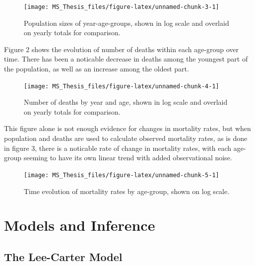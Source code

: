 \documentclass[
]{book}
\begin{document}
\begin{figure}[h]

{\centering \texttt{[image: MS\_Thesis\_files/figure-latex/unnamed-chunk-3-1]} 

}

\caption{Population sizes of year-age-groups, shown in log scale and overlaid on yearly totals for comparison.}\label{fig:unnamed-chunk-3}
\end{figure}

Figure 2 shows the evolution of number of deaths within each age-group over time. There has been a noticable decrease in deaths among the youngest part of the population, as well as an increase among the oldest part.

\begin{figure}[h]

{\centering \texttt{[image: MS\_Thesis\_files/figure-latex/unnamed-chunk-4-1]} 

}

\caption{Number of deaths by year and age, shown in log scale and overlaid on yearly totals for comparison.}\label{fig:unnamed-chunk-4}
\end{figure}

This figure alone is not enough evidence for changes in mortality rates, but when population and deaths are used to calculate observed mortality rates, as is done in figure 3, there is a noticable rate of change in mortality rates, with each age-group seeming to have its own linear trend with added observational noise.

\begin{figure}[h]

{\centering \texttt{[image: MS\_Thesis\_files/figure-latex/unnamed-chunk-5-1]} 

}

\caption{Time evolution of mortality rates by age-group, shown on log scale.}\label{fig:unnamed-chunk-5}
\end{figure}

\hypertarget{models-and-inference}{%
\chapter{Models and Inference}\label{models-and-inference}}

\hypertarget{the-lee-carter-model-1}{%
\section{The Lee-Carter Model}\label{the-lee-carter-model-1}}
\end{document}
